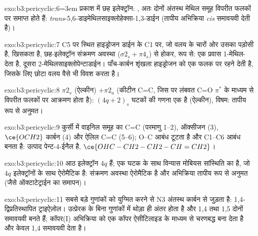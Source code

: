 \begin{solution}{exo:b3:pericyclic:6}\emergencystretch=3em
प्रकाश में छह इलेक्ट्रॉन: , अतः दोनों अंतस्थ मेथिल समूह
विपरीत फलकों पर समाप्त होते हैं: \textit{trans}-5,6-डाइमेथिलसाइक्लोहेक्सा-1,3-डाईन (तापीय अभिक्रिया
\textit{cis} समावयवी देती है)।
\end{solution}

\begin{solution}{exo:b3:pericyclic:7}
C5 पर स्थित हाइड्रोजन डाईन के C1 पर, जो वलय के चारों ओर उसका पड़ोसी है, खिसकता है,
छह-इलेक्ट्रॉन संक्रमण अवस्था ($\sigma2_s + \pi4_s$) से होकर,  रूप से: एक प्रवास
1-मेथिल- देता है, दूसरा 2-मेथिलसाइक्लोपेन्टाडाईन। पाँच-कार्बन शृंखला
हाइड्रोजन को एक फलक पर रहने देती है, जिसके लिए छोटा वलय वैसे भी विवश करता है।
\end{solution}

\begin{solution}{exo:b3:pericyclic:8}
$\pi2_s$ (ऐल्कीन) $+ \pi2_a$ (कीटीन C=C, जिस पर लंबवत C=O $\pi^*$ के माध्यम से विपरीत फलकों पर
आक्रमण होता है): $(4q + 2)_s$ घटकों की गणना एक है (ऐल्कीन), विषम:
तापीय रूप से अनुमत।
\end{solution}

\begin{solution}{exo:b3:pericyclic:9}
कुर्सी में वाइनिल समूह का C=C (परमाणु 1--2), ऑक्सीजन (3), $\ce{OCH2}$
कार्बन (4) और ऐलिल C=C (5--6); O--C आबंध टूटता है और C1--C6 आबंध बनता है:
उत्पाद पेन्ट-4-ईनैल है,
$\ce{OHC-CH2-CH2-CH=CH2}$।
\end{solution}

\begin{solution}{exo:b3:pericyclic:10}
आठ इलेक्ट्रॉन $4q$ हैं; एक  घटक के साथ विन्यास मोबियस
सांस्थिति का है, जो $4q$ इलेक्ट्रॉनों के साथ ऐरोमैटिक है: संक्रमण अवस्था ऐरोमैटिक है और
अभिक्रिया तापीय रूप से अनुमत (जैसे ऑक्टाटेट्राईन का  समापन)।
\end{solution}

\begin{solution}{exo:b3:pericyclic:11}
सबसे बड़े गुणांकों को युग्मित करने से N3 अंतस्थ कार्बन से जुड़ता है:
1,4-द्विप्रतिस्थापित ट्राइऐज़ोल। उत्प्रेरक के बिना गुणांकों में थोड़ा ही अंतर होता है और
1,4 तथा 1,5 दोनों समावयवी बनते हैं; कॉपर(I) अभिक्रिया को एक
कॉपर ऐसीटिलाइड के माध्यम से चरणबद्ध बना देता है और केवल 1,4 समावयवी देता है।
\end{solution}

